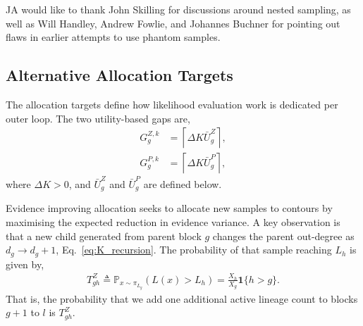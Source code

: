 \documentclass[pdflatex,sn-basic,icol]{sn-jnl}
\newcommand{\Prob}{\mathbb{P}}
\theoremstyle{plain}
\theoremstyle{definition}
\begin{document}

JA would like to thank John Skilling for discussions around nested sampling, as well as Will Handley, Andrew Fowlie, and Johannes Buchner for pointing out flaws in earlier attempts to use phantom samples.

\begin{appendices}

\section{Alternative Allocation Targets}\label{sec:allocation_targets}
The allocation targets define how likelihood evaluation work is dedicated per outer loop.
The two utility-based gaps are,
\begin{align}
    G_g^{Z,k} &= \left\lceil\Delta K \bar{U}^Z_g\right\rceil,\\
    G_g^{P,k} &= \left\lceil\Delta K \bar{U}^P_g\right\rceil,
\end{align}
where $\Delta K > 0$, and $\bar{U}^Z_g$ and $\bar{U}^P_g$ are defined below.

Evidence improving allocation seeks to allocate new samples to contours by maximising the expected reduction in evidence variance.
A key observation is that a new child generated from parent block $g$ changes the parent out-degree as $d_g\to d_g+1$, Eq.~\ref{eq:K_recursion}.
The probability of that sample reaching $L_h$ is given by,
\begin{align}
    T^Z_{g h}
    \triangleq
    \Prob_{x\sim\pi_{L_g}}(L(x)>L_h)
    = \frac{X_h}{X_g} \mathbf{1}\{h>g\}.
    \label{eq:evidence_reach_probability}
\end{align}
That is, the probability that we add one additional active lineage count to blocks $g+1$ to $l$ is $T^Z_{g h}$.


\end{appendices}
\end{document}
